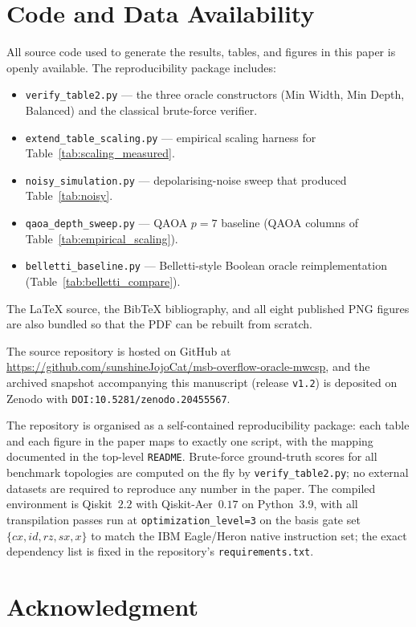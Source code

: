 \documentclass{ieeeaccess}
\begin{document}
\section*{Code and Data Availability}

All source code used to generate the results, tables, and figures in this paper is openly available. The reproducibility package includes:
\begin{itemize}
  \setlength\itemsep{1pt}
  \item \texttt{verify\_table2.py} --- the three oracle constructors (Min Width, Min Depth, Balanced) and the classical brute-force verifier.
  \item \texttt{extend\_table\_scaling.py} --- empirical scaling harness for Table~\ref{tab:scaling_measured}.
  \item \texttt{noisy\_simulation.py} --- depolarising-noise sweep that produced Table~\ref{tab:noisy}.
  \item \texttt{qaoa\_depth\_sweep.py} --- QAOA $p{=}7$ baseline (QAOA columns of Table~\ref{tab:empirical_scaling}).
  \item \texttt{belletti\_baseline.py} --- Belletti-style Boolean oracle reimplementation (Table~\ref{tab:belletti_compare}).
\end{itemize}
The \LaTeX{} source, the BibTeX bibliography, and all eight published PNG figures are also bundled so that the PDF can be rebuilt from scratch.

The source repository is hosted on GitHub at \url{https://github.com/sunshineJojoCat/msb-overflow-oracle-mwcsp}, and the archived snapshot accompanying this manuscript (release \texttt{v1.2}) is deposited on Zenodo with \texttt{DOI:10.5281/zenodo.20455567}.

The repository is organised as a self-contained reproducibility package: each table and each figure in the paper maps to exactly one script, with the mapping documented in the top-level \texttt{README}. Brute-force ground-truth scores for all benchmark topologies are computed on the fly by \texttt{verify\_table2.py}; no external datasets are required to reproduce any number in the paper. The compiled environment is Qiskit~$2.2$ with Qiskit-Aer~$0.17$ on Python~$3.9$, with all transpilation passes run at \texttt{optimization\_level=3} on the basis gate set $\{cx, id, rz, sx, x\}$ to match the IBM Eagle/Heron native instruction set; the exact dependency list is fixed in the repository's \texttt{requirements.txt}.

\section*{Acknowledgment}
\end{document}
